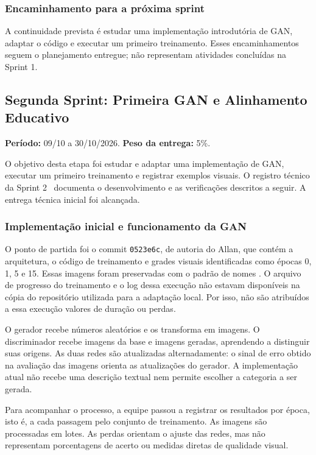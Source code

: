 \documentclass[12pt,a4paper]{article}
\begin{document}
\subsubsection{Encaminhamento para a próxima sprint}
A continuidade prevista é estudar uma implementação introdutória de GAN, adaptar o código e executar um primeiro treinamento. Esses encaminhamentos seguem o planejamento entregue; não representam atividades concluídas na Sprint 1.

\subsection{Segunda Sprint: Primeira GAN e Alinhamento Educativo}
\label{sec:sprint2}
\textbf{Período:} 09/10 a 30/10/2026. \textbf{Peso da entrega:} 5\%.

O objetivo desta etapa foi estudar e adaptar uma implementação de GAN, executar um primeiro treinamento e registrar exemplos visuais. O registro técnico da Sprint 2~\cite{registroS2} documenta o desenvolvimento e as verificações descritos a seguir. A entrega técnica inicial foi alcançada.

\subsubsection{Implementação inicial e funcionamento da GAN}
O ponto de partida foi o commit \texttt{0523e6c}, de autoria do Allan, que contém a arquitetura, o código de treinamento e grades visuais identificadas como épocas 0, 1, 5 e 15. Essas imagens foram preservadas com o padrão de nomes . O arquivo de progresso do treinamento e o log dessa execução não estavam disponíveis na cópia do repositório utilizada para a adaptação local. Por isso, não são atribuídos a essa execução valores de duração ou perdas.

O gerador recebe números aleatórios e os transforma em imagens. O discriminador recebe imagens da base e imagens geradas, aprendendo a distinguir suas origens. As duas redes são atualizadas alternadamente: o sinal de erro obtido na avaliação das imagens orienta as atualizações do gerador. A implementação atual não recebe uma descrição textual nem permite escolher a categoria a ser gerada.

Para acompanhar o processo, a equipe passou a registrar os resultados por época, isto é, a cada passagem pelo conjunto de treinamento. As imagens são processadas em lotes. As perdas orientam o ajuste das redes, mas não representam porcentagens de acerto ou medidas diretas de qualidade visual.
\end{document}
